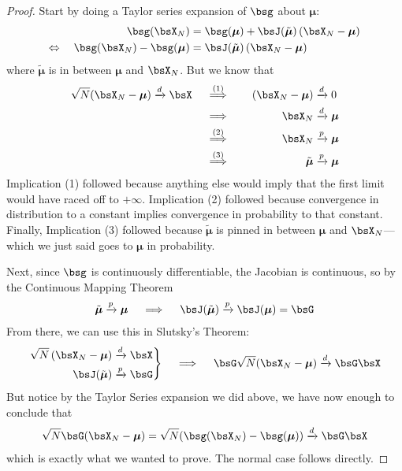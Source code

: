 \documentclass[12pt]{article}
\theoremstyle{plain}
\theoremstyle{definition}
\theoremstyle{remark}
\newcommand{\bsmu}{\boldsymbol{\mu}}
\newenvironment{rcases}
  {\left.\begin{aligned}}
  {\end{aligned}\right\rbrace}
\newcommand{\pto}{\xrightarrow{p}}
\newcommand{\dto}{\xrightarrow{d}}
\begin{document}
\begin{proof}
Start by doing a Taylor series expansion of $\bsg$ about $\bsmu$:
\begin{align*}
  \bsg(\bsX_N)
  &=
  \bsg(\bsmu)
  + \bsJ(\tilde{\bsmu}) \left( \bsX_N - \bsmu \right)
  \\
  \Leftrightarrow\quad
  \bsg(\bsX_N) - \bsg(\bsmu)
  &=
  \bsJ(\tilde{\bsmu}) \left( \bsX_N - \bsmu \right)
\end{align*}
where $\tilde{\bsmu}$ is in between $\bsmu$ and $\bsX_N$.
But we know that
\begin{alignat*}{3}
  \sqrt{N}(\bsX_N-\bsmu)
  \dto \bsX
  \quad\overset{(1)}{\implies}&&\quad
  (\bsX_N-\bsmu)
  &\dto 0 \\
  \quad\implies&&\quad
  \bsX_N
  &\dto \bsmu \\
  \quad\overset{(2)}{\implies}&&\quad
  \bsX_N
  &\pto \bsmu \\
  \quad\overset{(3)}{\implies}&&\quad
  \tilde{\bsmu}
  &\pto \bsmu
\end{alignat*}
Implication (1) followed because anything else would imply that the
first limit would have raced off to $+\infty$. Implication (2) followed
because convergence in distribution to a constant implies convergence in
probability to that constant.
Finally, Implication (3) followed because $\tilde{\bsmu}$ is pinned in
between $\bsmu$ and $\bsX_N$---which we just said goes to $\bsmu$ in
probability.

Next, since $\bsg$ is continuously differentiable, the Jacobian is
continuous, so by the Continuous Mapping Theorem
\begin{align*}
  \tilde{\bsmu} \pto \bsmu
  \quad\implies\quad
  \bsJ(\tilde{\bsmu})
  \pto \bsJ(\bsmu) = \bsG
\end{align*}
From there, we can use this in Slutsky's Theorem:
\begin{align*}
  \begin{rcases}
  \sqrt{N}\left(\bsX_N-\bsmu\right) &\dto \bsX \\
  \bsJ(\tilde{\bsmu}) &\pto \bsG
  \end{rcases}
  \quad\implies\quad
  \bsG \sqrt{N} (\bsX_N-\bsmu) \dto
  \bsG \bsX
\end{align*}
But notice by the Taylor Series expansion we did above, we have now
enough to conclude that
\begin{align*}
  \sqrt{N} \bsG (\bsX_N-\bsmu)
  = \sqrt{N}(\bsg(\bsX_N)-\bsg(\bsmu))
  \dto \bsG\bsX
\end{align*}
which is exactly what we wanted to prove.
The normal case follows directly.
\end{proof}
\end{document}

